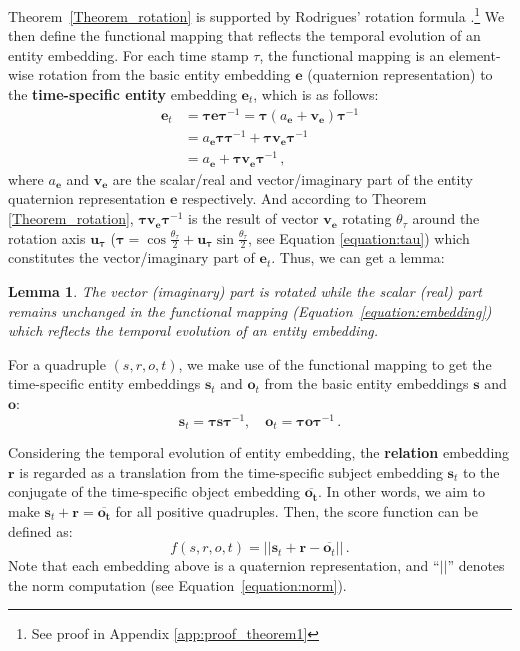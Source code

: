 \documentclass[11pt]{article}
\newcommand{\vect}[1]{\mathbf{#1}\xspace}
\newcommand{\vects}{\vect{s}\xspace}
\newcommand{\vectr}{\vect{r}\xspace}
\newcommand{\vecto}{\vect{o}\xspace}
\newtheorem{lemma}{Lemma}
\begin{document}
Theorem~\ref{Theorem_rotation} is supported by Rodrigues' rotation formula \cite{rodrigues1840lois}.\footnote{See proof in Appendix \ref{app:proof_theorem1}}
We then define the functional mapping that reflects the temporal evolution of an entity embedding. For each time stamp $\tau$, the functional mapping is an element-wise rotation from the basic entity embedding $\vect{e}$ (quaternion representation) to the \textbf{time-specific entity} embedding $\vect{e}_{t}$, which is as follows:
\begin{align}\label{equation:embedding}
    \vect{e}_{t} &= \pmb{\tau} \vect{e} \pmb{\tau}^{-1}
    = \pmb{\tau} (a_{\vect{e}} + {\vect{v_e}}) \pmb{\tau}^{-1} \nonumber\\
    &= a_{\vect{e}} \pmb{\tau} \pmb{\tau}^{-1} +  \pmb{\tau} {\vect{v_e}} \pmb{\tau}^{-1} \nonumber\\
    &= a_{\vect{e}} + \pmb{\tau} {\vect{v_e}} \pmb{\tau}^{-1} \, ,
\end{align}
where $a_{\vect{e}}$ and ${\vect{v_e}}$ are the scalar/real and vector/imaginary part of the entity quaternion representation $\vect{e}$ respectively. And according to Theorem \ref{Theorem_rotation}, $\pmb{\tau} {\vect{v_e}} \pmb{\tau}^{-1}$ is the result of vector $\vect{v_e}$ rotating ${\theta}_{\tau}$ around the rotation axis $\vect{u_{\tau}}$ ($\pmb{\tau} = \cos \frac{{\theta}_{\tau}}{2} + \vect{u_{\tau}} \sin \frac{{\theta}_{\tau}}{2}$, see Equation \ref{equation:tau}) which constitutes the vector/imaginary part of $\vect{e}_{t}$.
Thus, we can get a lemma:
\begin{lemma}\label{lemma:mapping}
The vector (imaginary) part is rotated while the scalar (real) part remains unchanged in the functional mapping (Equation~\ref{equation:embedding}) which reflects the temporal evolution of an entity embedding.
\end{lemma}

For a quadruple $(s, r, o, t)$, we make use of the functional mapping to get the time-specific entity embeddings $\vects_{t}$ and $\vecto_{t}$ from the basic entity embeddings $\vects$ and $\vecto$:
\begin{equation}
    \vects_{t} = \pmb{\tau} \vects \pmb{\tau}^{-1}, \quad
    \vecto_{t} = \pmb{\tau} \vecto \pmb{\tau}^{-1} \, .
\end{equation}

Considering the temporal evolution of entity embedding, the \textbf{relation} embedding $\vectr$ is regarded as a translation from the time-specific subject embedding $\vects_{t}$ to the conjugate of the time-specific object embedding $\vect{\overline{o_{t}}}$.
In other words, we aim to make $\vects_{t} + \vectr = \vect{\overline{o_{t}}}$ for all positive quadruples. Then, the score function can be defined as:
\begin{equation}\label{equation:score}
    f(s, r, o, t) =  \vert\vert\vects_{t} + \vectr - \overline{\vect{o}_t} \vert \vert \, .
\end{equation}
Note that each embedding above is a quaternion representation, and ``$\vert \vert$'' denotes the norm computation (see Equation~\ref{equation:norm}).
 
\end{document}
